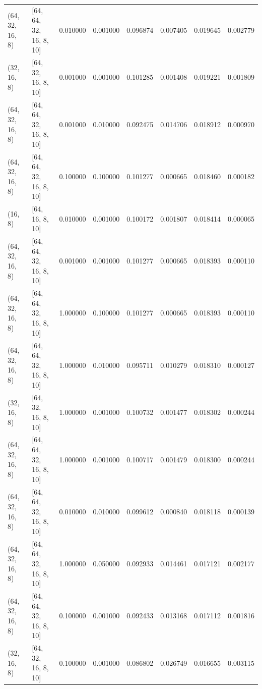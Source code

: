 \begin{tabular}{llrrrrrr}
(64, 32, 16, 8) & [64, 64, 32, 16, 8, 10] & 0.010000 & 0.001000 & 0.096874 & 0.007405 & 0.019645 & 0.002779 \\
(32, 16, 8) & [64, 32, 16, 8, 10] & 0.001000 & 0.001000 & 0.101285 & 0.001408 & 0.019221 & 0.001809 \\
(64, 32, 16, 8) & [64, 64, 32, 16, 8, 10] & 0.001000 & 0.010000 & 0.092475 & 0.014706 & 0.018912 & 0.000970 \\
(64, 32, 16, 8) & [64, 64, 32, 16, 8, 10] & 0.100000 & 0.100000 & 0.101277 & 0.000665 & 0.018460 & 0.000182 \\
(16, 8) & [64, 16, 8, 10] & 0.010000 & 0.001000 & 0.100172 & 0.001807 & 0.018414 & 0.000065 \\
(64, 32, 16, 8) & [64, 64, 32, 16, 8, 10] & 0.001000 & 0.001000 & 0.101277 & 0.000665 & 0.018393 & 0.000110 \\
(64, 32, 16, 8) & [64, 64, 32, 16, 8, 10] & 1.000000 & 0.100000 & 0.101277 & 0.000665 & 0.018393 & 0.000110 \\
(64, 32, 16, 8) & [64, 64, 32, 16, 8, 10] & 1.000000 & 0.010000 & 0.095711 & 0.010279 & 0.018310 & 0.000127 \\
(32, 16, 8) & [64, 32, 16, 8, 10] & 1.000000 & 0.001000 & 0.100732 & 0.001477 & 0.018302 & 0.000244 \\
(64, 32, 16, 8) & [64, 64, 32, 16, 8, 10] & 1.000000 & 0.001000 & 0.100717 & 0.001479 & 0.018300 & 0.000244 \\
(64, 32, 16, 8) & [64, 64, 32, 16, 8, 10] & 0.010000 & 0.010000 & 0.099612 & 0.000840 & 0.018118 & 0.000139 \\
(64, 32, 16, 8) & [64, 64, 32, 16, 8, 10] & 1.000000 & 0.050000 & 0.092933 & 0.014461 & 0.017121 & 0.002177 \\
(64, 32, 16, 8) & [64, 64, 32, 16, 8, 10] & 0.100000 & 0.001000 & 0.092433 & 0.013168 & 0.017112 & 0.001816 \\
(32, 16, 8) & [64, 32, 16, 8, 10] & 0.100000 & 0.001000 & 0.086802 & 0.026749 & 0.016655 & 0.003115 \\
\bottomrule
\end{tabular}
